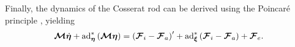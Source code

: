 Finally, the dynamics of the Cosserat rod can be derived using the Poincaré principle \cite{renda2018discrete}, yielding 
\begin{equation} \label{eq:crt_dynamics}
    \bm{\mathcal{M}} \dot{\bm{\eta}} + \textnormal{ad}^*_{\bm{\eta}} \left(\bm{\mathcal{M}} \bm{\eta}\right) = \left(\bm{\mathcal{F}}_i - \bm{\mathcal{F}}_a \right)' + \textnormal{ad}^*_{\bm{\xi}} \left(\bm{\mathcal{F}}_i - \bm{\mathcal{F}}_a \right) + \bm{\mathcal{F}}_{e} .
\end{equation}